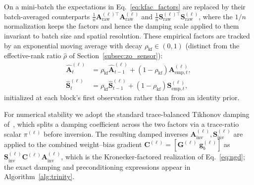 \documentclass[conference]{IEEEtran}
\begin{document}
On a mini-batch the expectations in Eq.~\eqref{eq:kfac_factors} are replaced by their batch-averaged counterparts $\tfrac{1}{n}\mathbf{A}^{(\ell)\top}_{\mathrm{raw}}\mathbf{A}^{(\ell)}_{\mathrm{raw}}$ and $\tfrac{1}{n}\mathbf{S}^{(\ell)\top}_{\mathrm{raw}}\mathbf{S}^{(\ell)}_{\mathrm{raw}}$, where the $1/n$ normalization keeps the factors and hence the damping scale applied to them invariant to batch size and spatial resolution. These empirical factors are tracked by an exponential moving average with decay $\rho_{\mathrm{kf}} \in (0,1)$ (distinct from the effective-rank ratio $\hat{\rho}$ of Section~\ref{subsec:zo_sensor}):
\begin{equation}
\label{eq:kfac_ema}
\begin{aligned}
\hat{\mathbf{A}}^{(\ell)}_t &= \rho_{\mathrm{kf}} \hat{\mathbf{A}}^{(\ell)}_{t-1} + (1-\rho_{\mathrm{kf}})\mathbf{A}^{(\ell)}_{\text{emp},t}, \\
\hat{\mathbf{S}}^{(\ell)}_t &= \rho_{\mathrm{kf}} \hat{\mathbf{S}}^{(\ell)}_{t-1} + (1-\rho_{\mathrm{kf}})\mathbf{S}^{(\ell)}_{\text{emp},t},
\end{aligned}
\end{equation}
initialized at each block's first observation rather than from an identity prior.

For numerical stability we adopt the standard trace-balanced Tikhonov damping of~\cite{martens2015optimizing}, which splits a damping coefficient across the two factors via a trace-ratio scalar $\pi^{(\ell)}$ before inversion. The resulting damped inverses $\mathbf{A}^{(\ell)}_{\mathrm{inv}}, \mathbf{S}^{(\ell)}_{\mathrm{inv}}$ are applied to the combined weight--bias gradient $\mathbf{C}^{(\ell)} = [\mathbf{G}^{(\ell)}\;\mathbf{g}_b^{(\ell)}]$ as $\mathbf{S}^{(\ell)}_{\mathrm{inv}}\mathbf{C}^{(\ell)}\mathbf{A}^{(\ell)}_{\mathrm{inv}}$, which is the Kronecker-factored realization of Eq.~\eqref{eq:ngd}; the exact damping and preconditioning expressions appear in Algorithm~\ref{alg:trinity}.
\end{document}
